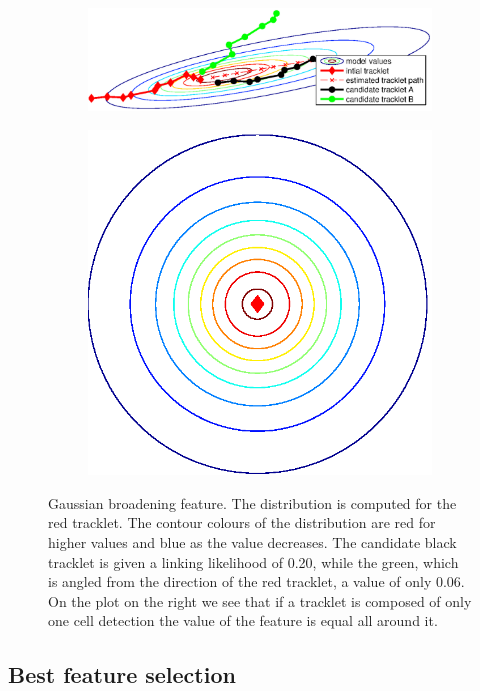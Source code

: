			\begin{figure}[h]
				\begin{subfigure}{.78\textwidth}
				  \includegraphics[width=\textwidth]{images/fig_gaussianbroadening1}
				\end{subfigure}%
				\hfill
				\begin{subfigure}{.2\textwidth}
				  \includegraphics[width=\textwidth]{images/fig_gaussianbroadening2}
				\end{subfigure}
				\caption{Gaussian broadening feature. The distribution is computed for the red tracklet. The contour colours of the distribution are red for higher values and blue as the value decreases. The candidate black tracklet is given a linking likelihood of 0.20, while the green, which is angled from the direction of the red tracklet, a value of only 0.06. On the plot on the right we see that if a tracklet is composed of only one cell detection the value of the feature is equal all around it.}
				\label{fig:gaussianbroadening}
			\end{figure}
			
  		\subsection{Best feature selection }
  			\label{sec:linkerbestfeatures}
	    	\notyetimplemented{}	    	
